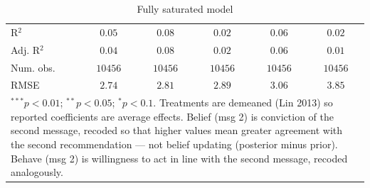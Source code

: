 \begin{table}
\begin{center}
\begin{tabular}{l c c c c c}
\hline
R$^2$                                             & $0.05$        & $0.08$        & $0.02$       & $0.06$        & $0.02$        \\
Adj. R$^2$                                        & $0.04$        & $0.08$        & $0.02$       & $0.06$        & $0.01$        \\
Num. obs.                                         & $10456$       & $10456$       & $10456$      & $10456$       & $10456$       \\
RMSE                                              & $2.74$        & $2.81$        & $2.89$       & $3.06$        & $3.85$        \\
\hline
\multicolumn{6}{l}{\scriptsize{\item $^{***}p<0.01$; $^{**}p<0.05$; $^{*}p<0.1$. Treatments are demeaned (Lin 2013) so reported coefficients are average effects. Belief (msg 2) is conviction of the second message, recoded so that higher values mean greater agreement with the second recommendation --- not belief updating (posterior minus prior). Behave (msg 2) is willingness to act in line with the second message, recoded analogously.}}
\end{tabular}
\caption{Fully saturated model}
\label{table:saturated}
\end{center}
\end{table}

